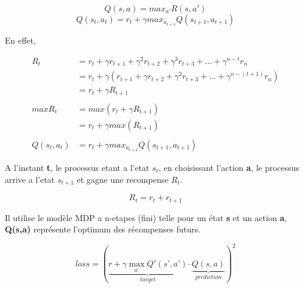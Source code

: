 \documentclass{article}
\begin{document}
\newpage

$$Q(s,a)=max_{a'}{R(s,a')}$$
$$Q(s_t,a_t)=r_t+{\gamma}max_{a_{t+1}}{Q(s_{t+1},a_{t+1})}$$

En effet, 

\begin{equation}
\begin{split}
R_t&=r_t+{\gamma}r_{t+1}+{\gamma^2}r_{t+2}+{\gamma^3}r_{t+3}+...+{\gamma^{n-t}}r_n \\
&=r_t+{\gamma}(r_{t+1}+{\gamma}r_{t+2}+{\gamma^2}r_{t+3}+...+{\gamma^{n-(t+1)}}r_n) \\
&=r_t+{\gamma}R_{t+1} \\
\\
maxR_t&=max(r_t+{\gamma}R_{t+1}) \\
&=r_t+{\gamma}max(R_{t+1}) \\
\\
Q(s_t,a_t)&=r_t+{\gamma}max_{a_{t+1}}{Q(s_{t+1},a_{t+1})}
\end{split}
\end{equation}


\newpage
A l'instant \textbf{t}, le processus etant a l'etat \textbf{$s_t$}, en choisissant l'action \textbf{a}, le processus arrive a l'etat \textbf{$s_{t+1}$} et gagne une recompense \textbf{$R_t$}.

$$R_t=r_t+r_{t+1}$$




Il utilise le modèle MDP a n-etapes (fini) telle pour un état \textbf{s} et un action \textbf{a}, \textbf{Q(s,a)} représente l'optimum des récompenses futurs.


$$loss = (\underbrace{r + \gamma \max_{a’} Q'(s’, a’)}_{target} – \underbrace{Q(s, a)}_{prediction})^2$$
\end{document}
